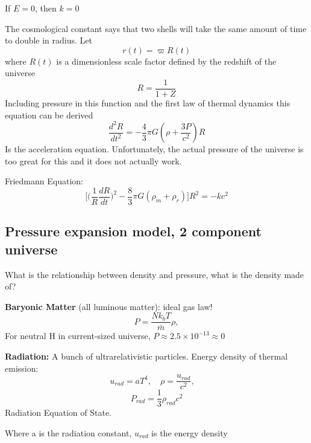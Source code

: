 If $E=0$, then $k=0$

The cosmological constant says that two shells will take the same amount of time to double in radius.
Let
\begin{equation}
	\label{}
	r(t)=\varpi R(t)
\end{equation}
where $R(t)$ is a dimensionless scale factor defined by the redshift of the universe
\begin{equation}
	\label{}
	R=\frac{1}{1+Z}
\end{equation}
Including pressure in this function and the first law of thermal dynamics this equation can be derived
\begin{equation}
	\label{}
	\frac{d^{2}R}{dt^{2}}=-\frac{4}{3}\pi G(\rho + \frac{3P}{c^{2}})R
\end{equation}
Is the acceleration equation. Unfortunately, the actual pressure of the universe is too great for this and it does not actually work.


Friedmann Equation:
\begin{equation}
	\label{}
	\bigg[\big(\frac{1}{R}\frac{dR}{dt}\big)^{2}-\frac{8}{3}\pi G(\rho_{m}+\rho_{r})\bigg]R^{2}=-kc^{2}
\end{equation}



\subsection{Pressure expansion model, 2 component universe}

What is the relationship between density and pressure, what is the density made of?

\textbf{Baryonic Matter} (all luminous matter): ideal gas law!
\begin{equation}
	\label{}
	P=\frac{Nk_{b}T}{\bar{m}}\rho,
\end{equation}
For neutral H in current-sized universe, $P\approx 2.5 \times 10^{-13}\approx 0$

\textbf{Radiation: } A bunch of ultrarelativistic particles. Energy density of thermal emission:
\begin{equation}
	\label{}
	u_{rad}=aT^{4},\quad \rho=\frac{u_{rad}}{c^{2}},\quad
\end{equation}
\begin{equation}
	\label{}
	 P_{rad}=\frac{1}{3}\rho_{rad}c^{2}
\end{equation}
Radiation Equation of State.


Where a is the radiation constant, $u_{rad}$ is the energy density


